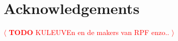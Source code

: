 \documentclass[review]{acmsiggraph}
\newcommand{\todo}[1]{\textcolor{red}{\(\langle\) \textbf{TODO} #1 \(\rangle\) }}
\begin{document}
\section*{Acknowledgements}
\todo{KULEUVEn en de makers van RPF enzo..}






\end{document}

